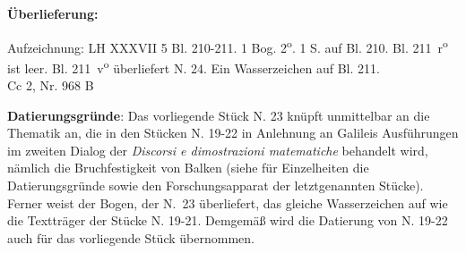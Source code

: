 \begin{ledgroupsized}[r]{120mm}
\footnotesize
\pstart
\noindent\textbf{\"{U}berlieferung:}
\pend
\end{ledgroupsized}
\begin{ledgroupsized}[r]{114mm}
\footnotesize
\pstart \parindent -6mm
%
Aufzeichnung: LH XXXVII 5 Bl. 210-211.
1 Bog. 2\textsuperscript{o}.
1  S. auf Bl. 210.
Bl. 211~r\textsuperscript{o} ist leer.
Bl. 211~v\textsuperscript{o} überliefert N. 24. %
Ein Wasserzeichen auf Bl. 211.\\%
Cc 2, Nr. 968 B
\pend
\end{ledgroupsized}
%
\vspace*{5mm}
\begin{ledgroup}
\footnotesize
\pstart
\noindent\footnotesize{\textbf{Datierungsgr\"{u}nde}:
Das vorliegende Stück N. 23 %
knüpft unmittelbar an die Thematik an,
die in den Stücken N. 19-22 %
in Anlehnung an Galileis\protect{}
Ausführungen im zweiten Dialog der \textit{Discorsi e dimostrazioni matematiche} behandelt wird,
nämlich die Bruchfestigkeit von Balken
(siehe für Einzelheiten die Datierungsgründe sowie den Forschungsapparat der letztgenannten Stücke).
Ferner weist der Bogen, der N.~23 %
überliefert, das gleiche Wasserzeichen auf wie die Textträger der Stücke N. 19-21. %
Demgemäß wird die Datierung von N. 19-22 %
auch für das vorliegende Stück übernommen.}
\pend
\end{ledgroup}
%
\vspace*{8mm}%
\normalsize
\count{}
\count{}
\count{}
\pstart\noindent
